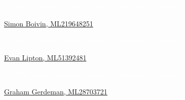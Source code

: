 \documentclass[t]{beamer}
\begin{document}
{
	\begin{frame}[t]{\textcolor{white}{Pg.\,293: Name the order, family, and identify the species.}}
		
		\tinyfill  \textcolor{white}{\href{https://macaulaylibrary.org/asset/219648251}{Simon Boivin, ML219648251}}
	\end{frame}
}

{
	\begin{frame}[t]{\textcolor{white}{Pg.\,322: Name the order, family, and identify the species.}}
		
		\tinyfill  \textcolor{white}{\href{https://macaulaylibrary.org/asset/51392481}{Evan Lipton, ML51392481}}
	\end{frame}
}

{
	\begin{frame}[t]{\textcolor{white}{Pg.\,322: Name the order, family, and identify the species.}}
		
		\tinyfill  \textcolor{white}{\href{https://macaulaylibrary.org/asset/28703721}{Graham Gerdeman, ML28703721}}
	\end{frame}
}
\end{document}
